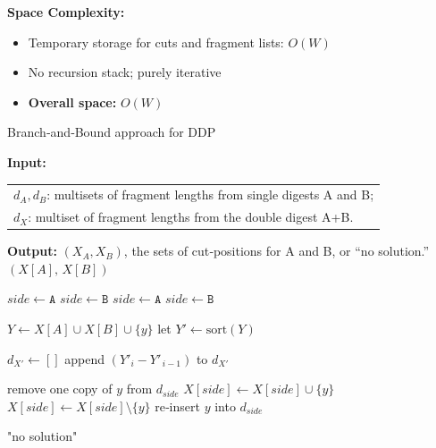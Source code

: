 \documentclass{article}
\begin{document}
\textbf{Space Complexity:}
\begin{itemize}
  \item Temporary storage for cuts and fragment lists: $O(W)$
  \item No recursion stack; purely iterative
  \item \textbf{Overall space:} $O(W)$
\end{itemize}




\begin{algorithm}[H]
\caption{Branch‐and‐Bound approach for DDP}
\label{alg:place}
\begin{algorithmic}
 \State \textbf{Input:}
    \begin{tabular}[t]{@{}l@{}}
      $d_A,d_B$: multisets of fragment lengths from single digests A and B;\\
      $d_X$: multiset of fragment lengths from the double digest A+B.
    \end{tabular}
  \State \textbf{Output:} $(X_A,X_B)$, the sets of cut‐positions for A and B, or “no solution.”
      \State \Return $(X[A],\,X[B])$
    \EndIf

      \State $ \mathit{side} \gets \texttt{A}$
      \State $ \mathit{side} \gets \texttt{B}$
      \State $ \mathit{side} \gets \texttt{A}$
    \Else
      \State $ \mathit{side} \gets \texttt{B}$
    \EndIf

      \State $Y \gets X[A] \cup X[B] \cup \{y\}$
      \State let $Y' \gets \mathrm{sort}(Y)$

      \State $d_{X'} \gets []$
        \State append $(Y'_i - Y'_{\,i-1})$ to $d_{X'}$
      \EndFor

        \State remove one copy of $y$ from $d_{\mathit{side}}$
        \State $X[\mathit{side}] \gets X[\mathit{side}] \cup \{y\}$
        \State {}
        \State $X[\mathit{side}] \gets X[\mathit{side}] \setminus \{y\}$
        \State re‑insert $y$ into $d_{\mathit{side}}$
      \EndIf
    \EndFor

    \State \Return \textsf{"no solution"}
  \EndProcedure
\end{algorithmic}
\end{algorithm}
\end{document}
